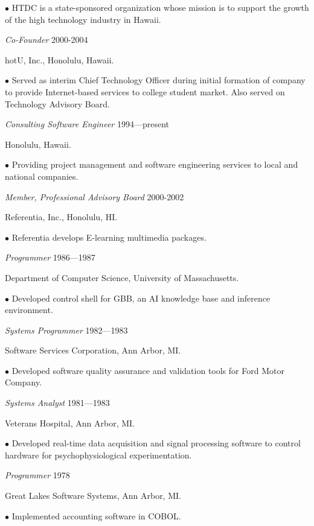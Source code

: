 \begin{Industry Experience}
  $\bullet$ HTDC is a state-sponsored organization whose mission
  is to support the growth of the high technology industry in Hawaii.


\item {\em Co-Founder} \hfill 2000-2004
\vspace*{-10pt}
\item hotU, Inc., Honolulu, Hawaii.

  $\bullet$ Served as interim Chief Technology Officer during initial
  formation of company to provide Internet-based services to college student market. Also served on Technology Advisory Board.


\item {\em Consulting Software Engineer} \hfill 1994---present
\vspace*{-10pt}
\item Honolulu, Hawaii.

  $\bullet$ Providing project management and software engineering services to local and national companies.

\item {\em Member, Professional Advisory Board} \hfill 2000-2002
\vspace*{-10pt}
\item Referentia, Inc., Honolulu, HI. 

  $\bullet$ Referentia develops E-learning multimedia packages.

\item {\em Programmer} \hfill  1986---1987  
\vspace*{-10pt}
\item Department of Computer Science, University of Massachusetts. 
  
  $\bullet$ Developed control shell for GBB, an AI knowledge base
  and inference environment. 
 
\item {\em Systems Programmer} \hfill  1982---1983 
\vspace*{-10pt}
\item Software Services Corporation, Ann Arbor, MI.

  $\bullet$ Developed software quality assurance and validation tools for
  Ford Motor Company. 
  
\item {\em Systems Analyst} \hfill 1981---1983
\vspace*{-10pt}
\item Veterans Hospital, Ann Arbor, MI.

  $\bullet$ Developed real-time data acquisition and signal processing
  software to control hardware for psychophysiological experimentation.
  
\item {\em Programmer} \hfill 1978
\vspace*{-10pt}
\item  Great Lakes Software Systems, Ann Arbor, MI.

  $\bullet$ Implemented accounting software in COBOL. 

\end{Industry Experience}



